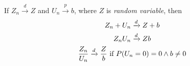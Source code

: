 \documentclass[]{article}
\begin{document}
		\begin{theorem}
			If $Z_n \xrightarrow{d} Z$ and $U_n \xrightarrow{p} b$, where $Z$ is \emph{random variable}, then
			\begin{gather*}
				Z_n + U_n \xrightarrow{d} Z + b \\
				Z_n U_n \xrightarrow{d} Zb \\
				\frac{Z_n}{U_n} \xrightarrow{d} \frac{Z}{b} \text{{ if }} P(U_n = 0) = 0 \land b \neq 0
			\end{gather*}
		\end{theorem}
\end{document}
